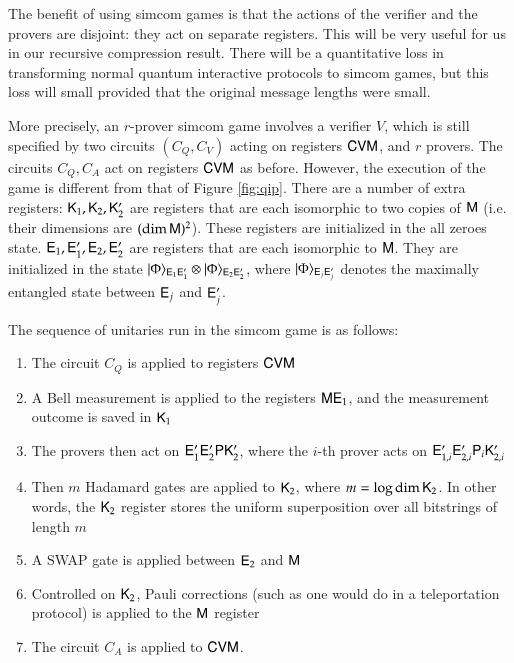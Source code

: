The benefit of using simcom games is that the actions of the verifier and the provers are disjoint: they act on separate registers. This will be very useful for us in our recursive compression result. There will be a quantitative loss in transforming normal quantum interactive protocols to simcom games, but this loss will small provided that the original message lengths were small. 

More precisely, an $r$-prover simcom game involves a verifier $V$, which 
is still specified by two circuits $(C_Q,C_V)$ acting on registers ${\mathsf{C}} {\mathsf{V}} {\mathsf{M}}$, and $r$ provers. The circuits $C_Q, C_A$ act on registers ${\mathsf{C}} {\mathsf{V}} {\mathsf{M}}$ as before. However, the execution of the game is different from that of Figure \ref{fig:qip}. There are a number of extra registers: ${\mathsf{K}}_1,{\mathsf{K}}_2,{\mathsf{K}}_2'$ are registers that are each isomorphic to two copies of ${\mathsf{M}}$ (i.e. their dimensions are $(\dim {\mathsf{M}})^2$). These registers are initialized in the all zeroes state. ${\mathsf{E}}_1,{\mathsf{E}}_1',{\mathsf{E}}_2,{\mathsf{E}}_2'$ are registers that are each isomorphic to ${\mathsf{M}}$. They are initialized in the state  $|\Phi\rangle_{{\mathsf{E}}_{1} {\mathsf{E}}_{1}'} \otimes |\Phi\rangle_{{\mathsf{E}}_{2} {\mathsf{E}}_{2}'}$, where $|\Phi\rangle_{{\mathsf{E}}_j {\mathsf{E}}_j'}$ denotes the maximally entangled state between ${\mathsf{E}}_j$ and ${\mathsf{E}}_j'$.

\medskip
\noindent The sequence of unitaries run in the simcom game is as follows:
\begin{enumerate}
	\item The circuit $C_Q$ is applied to registers ${\mathsf{C}} {\mathsf{V}} {\mathsf{M}}$
	\item A Bell measurement is applied to the registers ${\mathsf{M}} {\mathsf{E}}_1$, and the measurement outcome is saved in ${\mathsf{K}}_1$
	\item The provers then act on ${\mathsf{E}}_1' {\mathsf{E}}_2' {\mathsf{P}} {\mathsf{K}}_2'$, where the $i$-th prover acts on ${\mathsf{E}}_{1,i}' {\mathsf{E}}_{2,i}' {\mathsf{P}}_i {\mathsf{K}}_{2,i}'$
	\item Then $m$ Hadamard gates are applied to ${\mathsf{K}}_2$, where $m = \log \dim {\mathsf{K}}_2$. In other words, the ${\mathsf{K}}_2$ register stores the uniform superposition over all bitstrings of length $m$
	\item A SWAP gate is applied between ${\mathsf{E}}_2$ and ${\mathsf{M}}$
	\item Controlled on ${\mathsf{K}}_2$, Pauli corrections (such as one would do in a teleportation protocol) is applied to the ${\mathsf{M}}$ register
	\item The circuit $C_A$ is applied to ${\mathsf{C}} {\mathsf{V}} {\mathsf{M}}$.
\end{enumerate}


